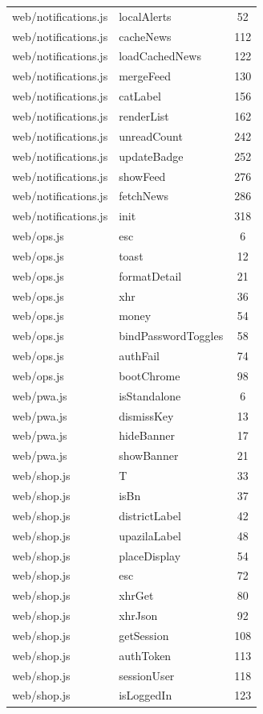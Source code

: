 \begin{center}
\begin{longtable}{@{}p{4.6cm}p{5.2cm}c@{}}
web/notifications.js & localAlerts & 52 \\
web/notifications.js & cacheNews & 112 \\
web/notifications.js & loadCachedNews & 122 \\
web/notifications.js & mergeFeed & 130 \\
web/notifications.js & catLabel & 156 \\
web/notifications.js & renderList & 162 \\
web/notifications.js & unreadCount & 242 \\
web/notifications.js & updateBadge & 252 \\
web/notifications.js & showFeed & 276 \\
web/notifications.js & fetchNews & 286 \\
web/notifications.js & init & 318 \\
web/ops.js & esc & 6 \\
web/ops.js & toast & 12 \\
web/ops.js & formatDetail & 21 \\
web/ops.js & xhr & 36 \\
web/ops.js & money & 54 \\
web/ops.js & bindPasswordToggles & 58 \\
web/ops.js & authFail & 74 \\
web/ops.js & bootChrome & 98 \\
web/pwa.js & isStandalone & 6 \\
web/pwa.js & dismissKey & 13 \\
web/pwa.js & hideBanner & 17 \\
web/pwa.js & showBanner & 21 \\
web/shop.js & T & 33 \\
web/shop.js & isBn & 37 \\
web/shop.js & districtLabel & 42 \\
web/shop.js & upazilaLabel & 48 \\
web/shop.js & placeDisplay & 54 \\
web/shop.js & esc & 72 \\
web/shop.js & xhrGet & 80 \\
web/shop.js & xhrJson & 92 \\
web/shop.js & getSession & 108 \\
web/shop.js & authToken & 113 \\
web/shop.js & sessionUser & 118 \\
web/shop.js & isLoggedIn & 123 \\

\end{longtable}
\end{center}
